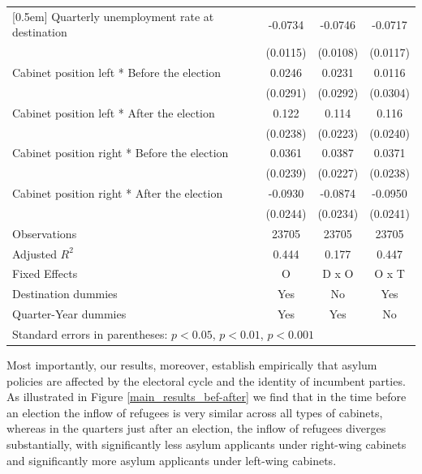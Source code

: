 \documentclass[a4paper,12pt]{article}
\newcommand{\sym}[1]{\rlap{#1}}
\begin{document}
\begin{table}[htbp]
\begin{tabular}{l*{3}{c}}
[0.5em]
Quarterly unemployment rate at destination&     -0.0734\sym{***}&     -0.0746\sym{***}&     -0.0717\sym{***}\\
                    &    (0.0115)         &    (0.0108)         &    (0.0117)         \\
[0.5em]
Cabinet position left * Before the election&      0.0246         &      0.0231         &      0.0116         \\
                    &    (0.0291)         &    (0.0292)         &    (0.0304)         \\
[0.5em]
Cabinet position left * After the election&       0.122\sym{***}&       0.114\sym{***}&       0.116\sym{***}\\
                    &    (0.0238)         &    (0.0223)         &    (0.0240)         \\
[0.5em]
Cabinet position right * Before the election&      0.0361         &      0.0387         &      0.0371         \\
                    &    (0.0239)         &    (0.0227)         &    (0.0238)         \\
[0.5em]
Cabinet position right * After the election&     -0.0930\sym{***}&     -0.0874\sym{***}&     -0.0950\sym{***}\\
                    &    (0.0244)         &    (0.0234)         &    (0.0241)         \\
\hline
Observations        &       23705         &       23705         &       23705         \\
Adjusted \(R^{2}\)  &       0.444         &       0.177         &       0.447         \\
Fixed Effects       &           O         &       D x O         &       O x T         \\
Destination dummies &         Yes         &          No         &         Yes         \\
Quarter-Year dummies&         Yes         &         Yes         &          No         \\
\hline\hline
\multicolumn{4}{l}{\footnotesize Standard errors in parentheses: \sym{*} \(p<0.05\), \sym{**} \(p<0.01\), \sym{***} \(p<0.001\)}\\
\end{tabular}
\label{tab:main_results}
\end{table}
 
 Most importantly, our results, moreover, establish empirically that asylum policies are affected by the electoral cycle and the identity of incumbent parties. As illustrated in Figure \ref{main_results_bef-after} we find that in the time before an election the inflow of refugees is very similar across all types of cabinets, whereas in the quarters just after an election, the inflow of refugees diverges substantially, with significantly less asylum applicants under right-wing cabinets and significantly more asylum applicants under left-wing cabinets. 
 
\end{document}
